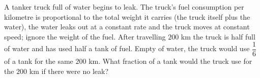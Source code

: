 A tanker truck full of water begins to leak. The truck's fuel consumption per kilometre is proportional to the total weight it carries (the truck itself plus the water), the water leaks out at a constant rate and the truck moves at constant speed; ignore the weight of the fuel. After travelling $200$ km the truck is half full of water and has used half a tank of fuel. Empty of water, the truck would use $\dfrac{1}{6}$ of a tank for the same $200$ km. What fraction of a tank would the truck use for the $200$ km if there were no leak?
